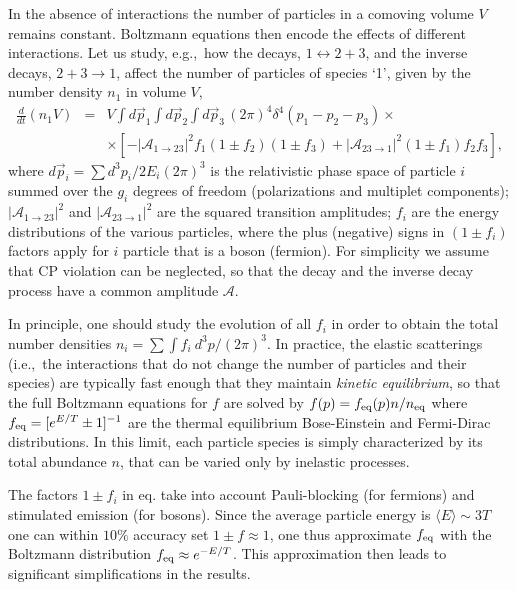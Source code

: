 In the absence of interactions the number of particles in a comoving volume $V$ remains constant.
Boltzmann equations then encode the effects of different interactions.
Let us study, e.g.,\ how the decays, $1\leftrightarrow 2+3$, and the inverse decays, $2+3\to1$,
affect the number of particles of species `1', given by the number density $n_1$ in volume $V$,
\begin{eqnarray}
\label{eq:Boltz1} \frac{d}{dt}(n_1 V) &=&V \int d\vec{p}_1\int d\vec{p}_2\int d\vec{p}_3\,
(2\pi)^4 \delta^4(p_1-p_2-p_3)\times\\
&&\times\nonumber [-|\mathscr{A}_{1\to 23}|^2 f_1(1\pm f_2)(1\pm f_3) + |\mathscr{A}_{23\to 1}|^2(1\pm f_1) f_2 f_3],
\end{eqnarray}
where $d\vec{p}_i = \sum d^3p_i/2E_i(2\pi)^3$ is the relativistic phase space of particle $i$
summed over the $g_i$ degrees of freedom (polarizations and multiplet components);
$|\mathscr{A}_{1\to 23}|^2$ and $|\mathscr{A}_{23\to 1}|^2$
are the squared transition amplitudes;
$f_i$ are the energy 
distributions of the various particles, where the plus (negative) signs in $(1\pm f_i)$ factors apply for $i$ particle that is a boson (fermion).
For simplicity we
assume that CP violation can be neglected, so that the decay and the inverse
decay process have a common amplitude $\mathscr{A}$.


In principle, one should study the evolution of all $f_i$ in order to obtain the total number densities 
$ n_i = \sum \int f_i~d^3p/(2\pi)^3$.
In practice, the elastic scatterings (i.e.,\ the interactions that do not change the number of particles and their species)
are typically fast enough that they maintain {\em kinetic equilibrium},
so that the full Boltzmann equations for $f$ are solved by 
$f(p) = f_{\rm eq}(p){n}/{n_{\rm eq}}$ where 
  $ \displaystyle  f_{\rm eq} = [e^{E/T}\pm 1]^{-1}$ are the thermal equilibrium Bose-Einstein and Fermi-Dirac distributions.
In this limit, each particle species is simply characterized by its total
abundance $n$,
that can be varied only by  inelastic processes.

  
  The factors $1\pm f_i$ in eq. take into account Pauli-blocking (for fermions) and stimulated emission (for bosons).
Since the average particle energy is $\langle E\rangle \sim 3T$ one can within $10\%$ accuracy set $1\pm f \approx 1$, one thus approximate $f_{\rm eq}$
with the Boltzmann distribution
$f_{\rm eq}\approx e^{-E/T}$.
This approximation then leads to significant simplifications in the results.




